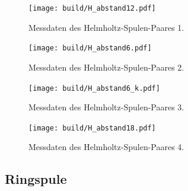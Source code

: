 \begin{figure}
  \centering
  \texttt{[image: build/H\_abstand12.pdf]}
  \caption{Messdaten des Helmholtz-Spulen-Paares 1.}\label{fig:H12}
\end{figure}

\begin{figure}
  \centering
  \texttt{[image: build/H\_abstand6.pdf]}
  \caption{Messdaten des Helmholtz-Spulen-Paares 2.}\label{fig:H6}
\end{figure}

\begin{figure}
  \centering
  \texttt{[image: build/H\_abstand6\_k.pdf]}
  \caption{Messdaten des Helmholtz-Spulen-Paares 3.}\label{fig:H6_1}
\end{figure}


\begin{figure}
  \centering
  \texttt{[image: build/H\_abstand18.pdf]}
  \caption{Messdaten des Helmholtz-Spulen-Paares 4.}\label{fig:H18}
\end{figure}

\newpage
\subsection{Ringspule}


